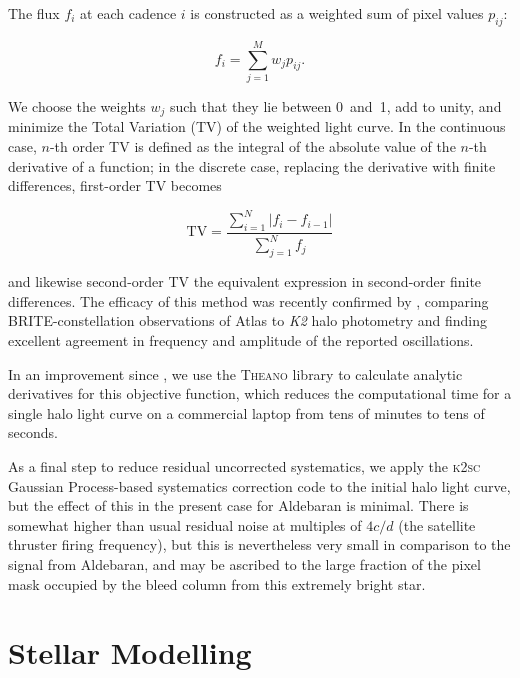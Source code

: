 \documentclass[modern]{aastex61}
\newcommand{\ktwo}{\emph{K2}\xspace}
\begin{document}
The flux $f_i$ at each cadence $i$ is constructed as a weighted sum of pixel values $p_{ij}$:

\begin{equation}
	f_i = \sum_{j=1}^{M} w_j p_{ij}.
\end{equation}

\noindent We choose the weights $w_j$ such that they lie between 0~and~1, add to unity, and minimize the Total Variation (TV) of the weighted light curve. In the continuous case, $n$-th order TV is defined as the integral of the absolute value of the $n$-th derivative of a function; in the discrete case, replacing the derivative with finite differences, first-order TV becomes

\begin{equation}
\text{TV} = \dfrac{\sum_{i=1}^{N} |{f}_i - {f}_{i-1}|}{\sum_{j=1}^{N} {f}_j}
\end{equation}

\noindent and likewise second-order TV the equivalent expression in second-order finite differences. The efficacy of this method was recently confirmed by \citet{kallinger2017}, comparing BRITE-constellation observations of Atlas to \ktwo halo photometry and finding excellent agreement in frequency and amplitude of the reported oscillations.

In an improvement since \citet{White2017}, we use the \textsc{Theano} library \citep{theano} to calculate analytic derivatives for this objective function, which reduces the computational time for a single halo light curve on a commercial laptop from tens of minutes to tens of seconds.

As a final step to reduce residual uncorrected systematics, we apply the \textsc{k2sc} \citep{k2sc} Gaussian Process-based systematics correction code to the initial halo light curve, but the effect of this in the present case for Aldebaran is minimal.
There is somewhat higher than usual residual noise at multiples of $4 c/d$ (the satellite thruster firing frequency), but this is nevertheless very small in comparison to the signal from Aldebaran, and may be ascribed to the large fraction of the pixel mask occupied by the bleed column from this extremely bright star.


\section{Stellar Modelling}\label{sec:mod}
\end{document}
